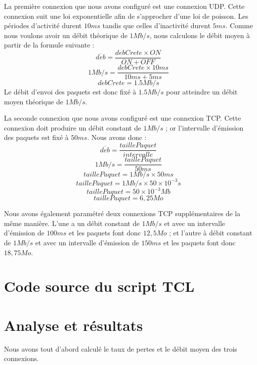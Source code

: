 \documentclass[a4paper]{article}
\begin{document}
La première connexion que nous avons configuré est une connexion UDP. Cette connexion suit une loi exponentielle afin de s'approcher d'une loi de poisson. Les périodes d'activité durent $10ms$ tandis que celles d'inactivité durent $5ms$. Comme nous voulons avoir un débit théorique de $1Mb/s$, nous calculons le débit moyen à partir de la formule suivante : 
$$ \overline{deb} = \frac{debCrete \times ON}{ON + OFF} $$
$$ 1Mb/s = \frac{debCrete \times 10ms}{10ms + 5ms} $$
$$ debCrete = 1.5Mb/s $$
Le débit d'envoi des paquets est donc fixé à $1.5Mb/s$ pour atteindre un débit moyen théorique de $1Mb/s$.

La seconde connexion que nous avons configuré est une connexion TCP. Cette connexion doit produire un débit constant de $1Mb/s$ ; or l'intervalle d'émission des paquets est fixé à $50ms$. Nous avons donc :
$$ \overline{deb} = \frac{taillePaquet}{intervalle} $$
$$ 1Mb/s = \frac{taillePaquet}{50ms} $$
$$ taillePaquet = 1Mb/s \times 50ms $$
$$ taillePaquet = 1Mb/s \times 50 \times 10^{-3}s $$
$$ taillePaquet = 50 \times 10^{-3}Mb $$
$$ taillePaquet =  6,25 Mo $$

Nous avons également paramétré deux connexions TCP supplémentaires de la même manière. L'une a un débit constant de $1Mb/s$ et avec un intervalle d'émission de $100ms$ et les paquets font donc $12,5 Mo$ ; et l'autre à débit constant de $1Mb/s$ et avec un intervalle d'émission de $150ms$ et les paquets font donc $18,75 Mo$.



\section{Code source du script TCL}




\section{Analyse et résultats}

Nous avons tout d'abord calculé le taux de pertes et le débit moyen des trois connexions.
\end{document}
